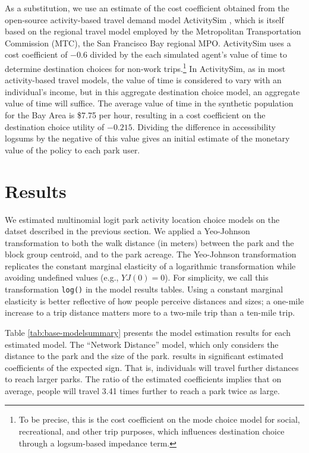\documentclass[3p, authoryear, review]{elsarticle} %
\begin{document}
As a substitution, we use an estimate of the cost coefficient obtained from the
open-source activity-based travel demand model ActivitySim \citep{activitysim}, which is itself
based on the regional travel model employed by the Metropolitan Transportation
Commission (MTC), the San Francisco Bay regional MPO. ActivitySim uses a cost
coefficient of \(-0.6\) divided by the each simulated agent's value of time to
determine destination choices for non-work trips.\footnote{To be precise, this is the
  cost coefficient on the mode choice model for social, recreational, and other
  trip purposes, which influences destination choice through a logsum-based
  impedance term.} In ActivitySim, as in most activity-based travel models, the
value of time is considered to vary with an individual's income, but in this
aggregate destination choice model, an aggregate value of time will suffice. The
average value of time in the synthetic population for the Bay Area is \$7.75 per
hour, resulting in a cost coefficient on the destination choice utility of
\(-0.215\). Dividing the difference in accessibility logsums by the negative of
this value gives an initial estimate of the monetary value of the policy to each
park user.

\hypertarget{results}{%
\section{Results}\label{results}}

We estimated multinomial logit park activity location choice models on the
datset described in the previous section. We applied a Yeo-Johnson
transformation \citep{Yeo2000} to both the walk distance (in meters) between the
park and the block group centroid, and to the park acreage. The Yeo-Johnson
transformation replicates the constant marginal elasticity of a logarithmic
transformation while avoiding undefined values (e.g., \(YJ(0) = 0\)). For
simplicity, we call this transformation \texttt{log()} in the model results tables.
Using a constant marginal elasticity is better reflective of how people perceive
distances and sizes; a one-mile increase to a trip distance matters more to a
two-mile trip than a ten-mile trip.

Table \ref{tab:base-modelsummary} presents the model estimation results for
each estimated model. The ``Network Distance'' model, which only considers the
distance to the park and the size of the park. results in significant estimated
coefficients of the expected sign. That is, individuals will travel further
distances to reach larger parks. The ratio of the estimated coefficients implies
that on average, people will travel 3.41 times further to reach a
park twice as large.
\end{document}
